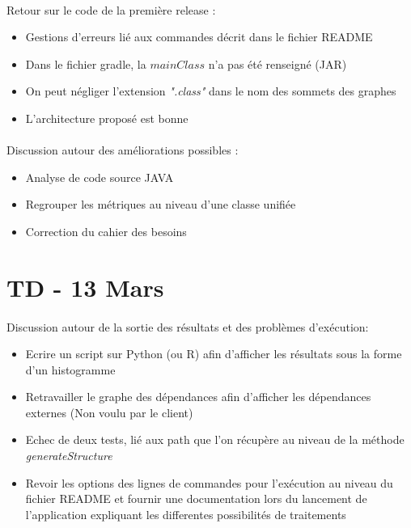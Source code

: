 \documentclass{scrartcl}
\begin{document}
\paragraph{}Retour sur le code de la première release :
\begin{itemize}
    \item Gestions d'erreurs lié aux commandes décrit dans le fichier README
    \item Dans le fichier gradle, la $mainClass$ n'a pas été renseigné (JAR)
    \item On peut négliger l'extension \textit{".class"} dans le nom des sommets des graphes
    \item L'architecture proposé est bonne
\end{itemize}
\paragraph{}Discussion autour des améliorations possibles :
\begin{itemize}
    \item Analyse de code source JAVA
    \item Regrouper les métriques au niveau d'une classe unifiée
    \item Correction du cahier des besoins
\end{itemize}

\section{TD - 13 Mars}
\paragraph{}Discussion autour de la sortie des résultats et des problèmes d'exécution:
\begin{itemize}
    \item Ecrire un script sur Python (ou R) afin d'afficher les résultats sous la forme d'un histogramme
    \item Retravailler le graphe des dépendances afin d'afficher les dépendances externes (Non voulu par le client)
    \item Echec de deux tests, lié aux path que l'on récupère au  niveau de la méthode \emph{generateStructure}
    \item Revoir les options des lignes de commandes pour l'exécution au niveau du fichier README et fournir une documentation lors du lancement de l'application expliquant les differentes possibilités de traitements
\end{itemize}
\end{document}

